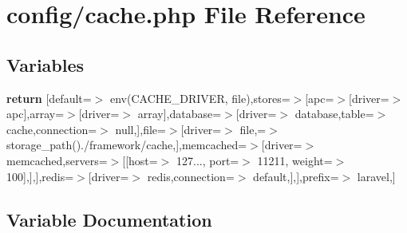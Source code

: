 \section{config/cache.php File Reference}
\label{config_2cache_8php}
\subsection*{Variables}
\begin{DoxyCompactItemize}
\item 
{\bf return} [\textquotesingle{}default\textquotesingle{}=$>$ env(\textquotesingle{}C\+A\+C\+H\+E\+\_\+\+D\+R\+I\+V\+E\+R\textquotesingle{}, \textquotesingle{}file\textquotesingle{}),\textquotesingle{}stores\textquotesingle{}=$>$[\textquotesingle{}apc\textquotesingle{}=$>$[\textquotesingle{}driver\textquotesingle{}=$>$ \textquotesingle{}apc\textquotesingle{}],\textquotesingle{}array\textquotesingle{}=$>$[\textquotesingle{}driver\textquotesingle{}=$>$ \textquotesingle{}array\textquotesingle{}],\textquotesingle{}database\textquotesingle{}=$>$[\textquotesingle{}driver\textquotesingle{}=$>$ \textquotesingle{}database\textquotesingle{},\textquotesingle{}table\textquotesingle{}=$>$ \textquotesingle{}cache\textquotesingle{},\textquotesingle{}connection\textquotesingle{}=$>$ null,],\textquotesingle{}file\textquotesingle{}=$>$[\textquotesingle{}driver\textquotesingle{}=$>$ \textquotesingle{}file\textquotesingle{},\textquotesingle{}=$>$ storage\+\_\+path().\textquotesingle{}/framework/cache\textquotesingle{},],\textquotesingle{}memcached\textquotesingle{}=$>$[\textquotesingle{}driver\textquotesingle{}=$>$ \textquotesingle{}memcached\textquotesingle{},\textquotesingle{}servers\textquotesingle{}=$>$[[\textquotesingle{}host\textquotesingle{}=$>$ \textquotesingle{}127...\textquotesingle{}, \textquotesingle{}port\textquotesingle{}=$>$ 11211, \textquotesingle{}weight\textquotesingle{}=$>$ 100],],],\textquotesingle{}redis\textquotesingle{}=$>$[\textquotesingle{}driver\textquotesingle{}=$>$ \textquotesingle{}redis\textquotesingle{},\textquotesingle{}connection\textquotesingle{}=$>$ \textquotesingle{}default\textquotesingle{},],],\textquotesingle{}prefix\textquotesingle{}=$>$ \textquotesingle{}laravel\textquotesingle{},]
\end{DoxyCompactItemize}


\subsection{Variable Documentation}
